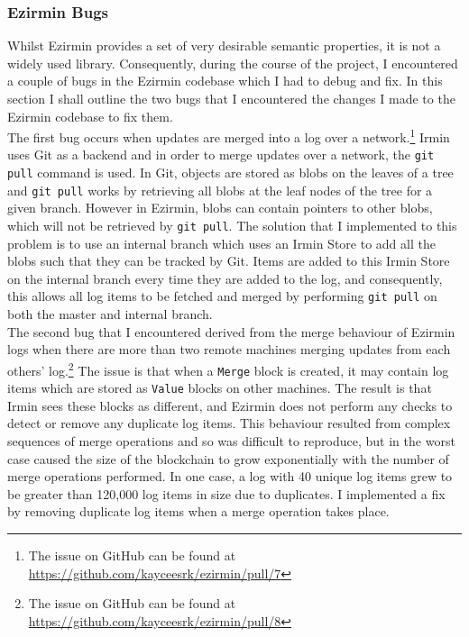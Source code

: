 \documentclass[12pt,a4paper,twoside,openright]{report}
\begin{document}
	\subsubsection*{Ezirmin Bugs}
	Whilst Ezirmin provides a set of very desirable semantic properties, it is not a widely used library. 
	Consequently, during the course of the project, I encountered a couple of bugs in the Ezirmin codebase which I had to debug and fix.
	In this section I shall outline the two bugs that I encountered the changes I made to the Ezirmin codebase to fix them.\\
	
	The first bug occurs when updates are merged into a log over a network.\footnote{The issue on GitHub can be found at \href{https://github.com/kayceesrk/ezirmin/pull/7}{https://github.com/kayceesrk/ezirmin/pull/7}}
	Irmin uses Git as a backend and in order to merge updates over a network, the \texttt{git pull} command is used.
	In Git, objects are stored as blobs on the leaves of a tree and \texttt{git pull} works by retrieving all blobs at the leaf nodes of the tree for a given branch.
	However in Ezirmin, blobs can contain pointers to other blobs, which will not be retrieved by \texttt{git pull}.
	The solution that I implemented to this problem is to use an internal branch which uses an Irmin Store to add all the blobs such that they can be tracked by Git.
	Items are added to this Irmin Store on the internal branch every time they are added to the log, and consequently, this allows all log items to be fetched and merged by performing \texttt{git pull} on both the master and internal branch.\\

	The second bug that I encountered derived from the merge behaviour of Ezirmin logs when there are more than two remote machines merging updates from each others' log.\footnote{The issue on GitHub can be found at \href{https://github.com/kayceesrk/ezirmin/pull/8}{https://github.com/kayceesrk/ezirmin/pull/8}}
	The issue is that when a \texttt{Merge} block is created, it may contain log items which are stored as \texttt{Value} blocks on other machines.
	The result is that Irmin sees these blocks as different, and Ezirmin does not perform any checks to detect or remove any duplicate log items.
	This behaviour resulted from complex sequences of merge operations and so was difficult to reproduce, but in the worst case caused the size of the blockchain to grow exponentially with the number of merge operations performed.
	In one case, a log with 40 unique log items grew to be greater than 120,000 log items in size due to duplicates.
	I implemented a fix by removing duplicate log items when a merge operation takes place. 
\end{document}

